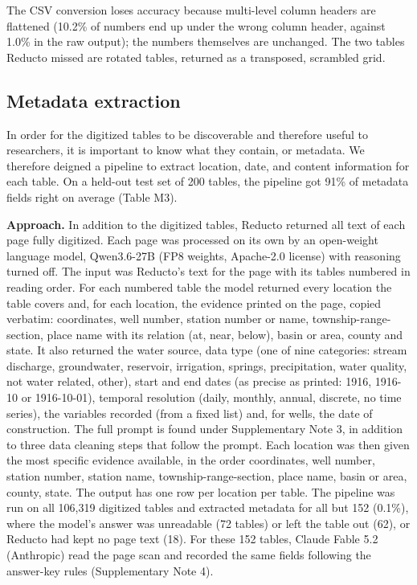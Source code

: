 The CSV conversion loses accuracy because multi-level column headers are flattened (10.2\% of numbers end up under the wrong column header, against 1.0\% in the raw output); the numbers themselves are unchanged. The two tables Reducto missed are rotated tables, returned as a transposed, scrambled grid.

\subsection*{Metadata extraction}

In order for the digitized tables to be discoverable and therefore useful to researchers, it is important to know what they contain, or metadata. We therefore deigned a pipeline to extract location, date, and content information for each table. On a held-out test set of 200 tables, the pipeline got 91\% of metadata fields right on average (Table M3).

\textbf{Approach.} In addition to the digitized tables, Reducto returned all text of each page fully digitized. Each page was processed on its own by an open-weight language model, Qwen3.6-27B (FP8 weights, Apache-2.0 license) with reasoning turned off. The input was Reducto's text for the page with its tables numbered in reading order. For each numbered table the model returned every location the table covers and, for each location, the evidence printed on the page, copied verbatim: coordinates, well number, station number or name, township-range-section, place name with its relation (at, near, below), basin or area, county and state. It also returned the water source, data type (one of nine categories: stream discharge, groundwater, reservoir, irrigation, springs, precipitation, water quality, not water related, other), start and end dates (as precise as printed: 1916, 1916-10 or 1916-10-01), temporal resolution (daily, monthly, annual, discrete, no time series), the variables recorded (from a fixed list) and, for wells, the date of construction. The full prompt is found under Supplementary Note 3, in addition to three data cleaning steps that follow the prompt. Each location was then given the most specific evidence available, in the order coordinates, well number, station number, station name, township-range-section, place name, basin or area, county, state. The output has one row per location per table. The pipeline was run on all 106,319 digitized tables and extracted metadata for all but 152 (0.1\%), where the model's answer was unreadable (72 tables) or left the table out (62), or Reducto had kept no page text (18). For these 152 tables, Claude Fable 5.2 (Anthropic) read the page scan and recorded the same fields following the answer-key rules (Supplementary Note 4).

